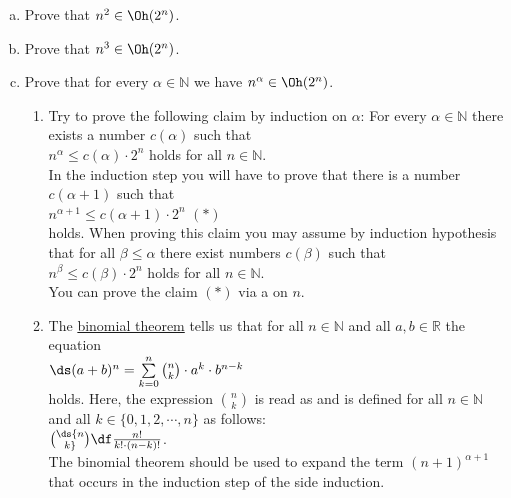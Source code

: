\exercise
\begin{enumerate}[(a)]
\item Prove that $n^2 \in \Oh(2^n)$. 
\item Prove that $n^3 \in \Oh(2^n)$. 
\item Prove that for every $\alpha \in \mathbb{N}$ we have  $n^\alpha \in \Oh(2^n)$. 
      
      \hint
      \begin{enumerate}[1.]
      \item Try to prove the following claim by induction on $\alpha$:  For every $\alpha \in \mathbb{N}$
            there exists a number $c(\alpha)$ such that
            \\[0.2cm]
            \hspace*{1.3cm}
            $n^\alpha \leq c(\alpha) \cdot 2^n$ \quad holds for all $n \in \mathbb{N}$.
            \\[0.2cm]
            In the induction step you will have to prove that there is a number $c(\alpha+1)$ such that
            \\[0.2cm]
            \hspace*{1.3cm}
            $n^{\alpha+1} \leq c(\alpha+1) \cdot 2^n$ \hspace*{\fill} $(*)$
            \\[0.2cm]
            holds.  When proving this claim you may assume by induction hypothesis that for all 
            $\beta \leq \alpha$ there exist numbers $c(\beta)$ such that
            \\[0.2cm]
            \hspace*{1.3cm}
            $n^{\beta} \leq c(\beta) \cdot 2^n$ \quad holds for all $n \in \mathbb{N}$.
            \\[0.2cm]
            You can prove the claim $(*)$ via a  on $n$.
      \item The \href{https://en.wikipedia.org/wiki/Binomial_theorem}{binomial theorem}
            tells
            us that for all $n \in \mathbb{N}$ and all $a,b \in \mathbb{R}$ the equation
            \\[0.2cm]
            \hspace*{1.3cm}
            $\ds (a+b)^n = \sum\limits_{k=0}^n {n \choose k} \cdot a^k \cdot b^{n-k}$
            \\[0.2cm]
            holds.  Here, the expression ${n \choose k}$ is read as  and is
            defined for all $n \in \mathbb{N}$ and all $k \in \{0, 1, 2, \cdots, n\}$ as follows:
            \\[0.2cm]
            \hspace*{1.3cm}
            $\ds {n \choose k} \df \frac{n!}{k! \cdot (n-k)!}$.
            \\[0.2cm]
            The binomial theorem should be used to expand the term $(n+1)^{\alpha + 1}$ that occurs
            in the induction step of the side induction.  \eox
      \end{enumerate}
\end{enumerate}
